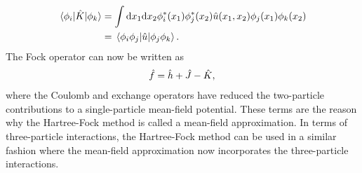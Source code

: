             \begin{align}
                \mel*{\phi_i}{\hat{K}}{\phi_k}
                &= \int\dd x_1\dd x_2
                \phi^{*}_i(x_1)\phi^{*}_j(x_2)
                \hat{u}(x_1, x_2)
                \phi_j(x_1)\phi_k(x_2)
                \\
                &=
                \mel*{\phi_i\phi_j}{\hat{u}}{\phi_j\phi_k}.
            \end{align}
            The Fock operator can now be written as
            \begin{align}
                \hat{f}
                = \hat{h}
                + \hat{J} - \hat{K},
            \end{align}
            where the Coulomb and exchange operators have reduced the
            two-particle contributions to a single-particle mean-field
            potential.
            These terms are the reason why the Hartree-Fock method is called a
            mean-field approximation.
            In terms of three-particle interactions, the Hartree-Fock method can
            be used in a similar fashion where the mean-field approximation now
            incorporates the three-particle interactions.

